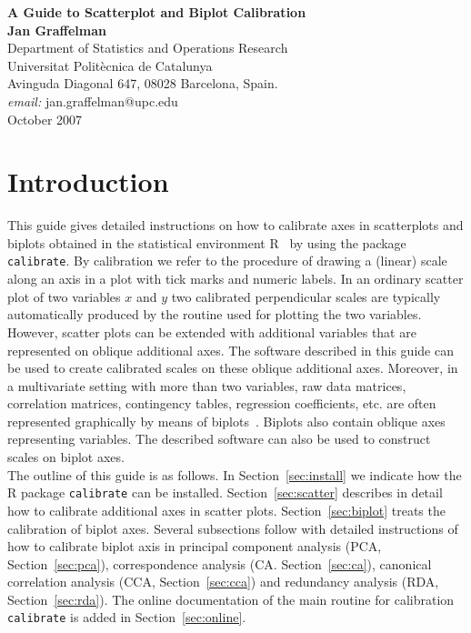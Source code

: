 \documentclass[a4paper]{article}
\begin{document}


\begin{center}
\sf
{\sf \bf \Large A Guide to Scatterplot and Biplot Calibration}\\
\vspace{4mm}
{\bf \large Jan Graffelman}\\
\vspace{4mm} \rm \large
Department of Statistics and Operations Research\\
Universitat Polit\`ecnica de Catalunya\\
Avinguda Diagonal 647, 08028 Barcelona, Spain.\\
{\it email:} jan.graffelman@upc.edu\\
\vspace{4mm}
{\sc October 2007}
\end{center}

\section{Introduction}

This guide gives detailed instructions on how to calibrate axes in scatterplots
and biplots obtained in the statistical environment R~\cite{RRR} by using the package
{\tt calibrate}. By calibration we 
refer to the procedure of drawing a (linear) scale along an axis in a plot with 
tick marks and numeric labels. In an ordinary scatter plot of two variables $x$ and $y$ 
two calibrated perpendicular scales are typically automatically produced by the 
routine used for plotting the two variables. However, scatter plots can be
extended with additional variables that are represented on oblique additional
axes. The software described in this guide can be used to create calibrated
scales on these oblique additional axes. Moreover, in a multivariate setting with more
than two variables, raw data matrices, correlation matrices, contingency tables,
regression coefficients, etc. are often represented graphically by means of biplots~\cite{Gabriel}. Biplots
also contain oblique axes representing variables. The described software can also be
used to construct scales on biplot axes.\\

The outline of this guide is as follows. In Section~\ref{sec:install} we indicate how the 
R package {\tt calibrate} can be installed. Section~\ref{sec:scatter} describes in detail
how to calibrate additional axes in scatter plots. Section~\ref{sec:biplot} treats the 
calibration of biplot axes. Several subsections follow with detailed
instructions of how to calibrate biplot axis in principal component analysis
(PCA, Section~\ref{sec:pca}), correspondence analysis (CA. Section~\ref{sec:ca}), 
canonical correlation analysis (CCA, Section~\ref{sec:cca}) and redundancy analysis (RDA, Section~\ref{sec:rda}). 
The online documentation of the main routine for calibration {\tt calibrate} is added in 
Section~\ref{sec:online}.\\
\end{document}
